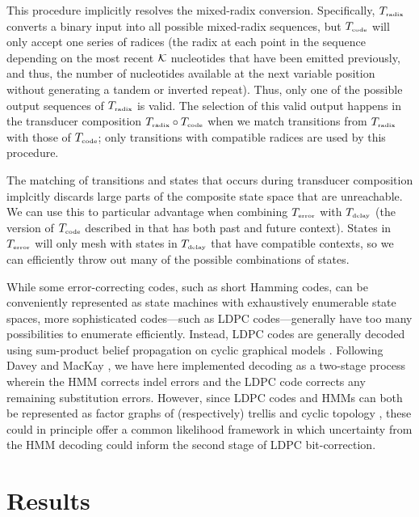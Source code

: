 \documentclass[english]{article}
\begin{document}
This procedure implicitly resolves the mixed-radix conversion.
Specifically, $T_{\mbox{\tiny radix}}$ converts a binary input into all possible mixed-radix sequences,
but $T_{\mbox{\tiny code}}$ will only accept one series of radices (the radix at each point in the sequence depending
on the most recent ${\cal K}$ nucleotides that have been emitted previously, and thus, the number of nucleotides available
at the next variable position without generating a tandem or inverted repeat).
Thus, only one of the possible output sequences of $T_{\mbox{\tiny radix}}$ is valid.
The selection of this valid output happens in the transducer composition $T_{\mbox{\tiny radix}} \circ T_{\mbox{\tiny code}}$
when we match transitions from $T_{\mbox{\tiny radix}}$ with those of $T_{\mbox{\tiny code}}$;
only transitions with compatible radices are used by this procedure.

The matching of transitions and states that occurs during transducer composition
implcitly discards large parts of the composite state space that are unreachable.
We can use this to particular advantage when combining $T_{\mbox{\tiny error}}$ with $T_{\mbox{\tiny delay}}$
(the version of $T_{\mbox{\tiny code}}$ described in  that has both past and future context).
States in $T_{\mbox{\tiny error}}$ will only mesh with states in $T_{\mbox{\tiny delay}}$ that have compatible contexts,
so we can efficiently throw out many of the possible combinations of states.

While some error-correcting codes, such as short Hamming codes, can be conveniently represented
as state machines with exhaustively enumerable state spaces,
more sophisticated codes---such as LDPC codes---generally have too many possibilities to enumerate efficiently.
Instead, LDPC codes are generally decoded using sum-product belief propagation on cyclic graphical models \cite{Mackay1997,FreyMackay98}.
Following Davey and MacKay \cite{DaveyMackay2000},
we have here implemented decoding as a two-stage process wherein the HMM corrects indel errors
and the LDPC code corrects any remaining substitution errors.
However, since LDPC codes and HMMs can both be represented as factor graphs
of (respectively) trellis and cyclic topology \cite{Kschischang2006},
these could in principle offer a common likelihood framework in which uncertainty from the HMM decoding
could inform the second stage of LDPC bit-correction.


\section{Results}
\end{document}
